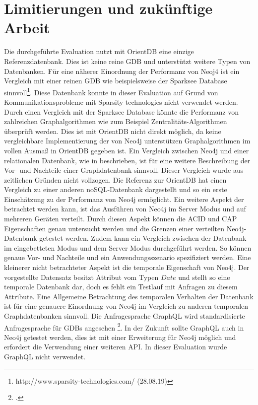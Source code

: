 \section{Limitierungen und zukünftige Arbeit}
Die durchgeführte Evaluation nutzt mit OrientDB  eine einzige Referenzdatenbank. Dies ist keine reine GDB und unterstützt weitere Typen von Datenbanken. Für eine näherer Einordnung der Performanz von Neoj4 ist ein Vergleich mit einer reinen GDB wie beispielsweise der Sparksee Database sinnvoll\footnote{http://www.sparsity-technologies.com/ (28.08.19)}. Diese Datenbank konnte in dieser Evaluation auf Grund von Kommunikationsprobleme mit Sparsity technologies nicht verwendet werden. Durch einen Vergleich mit der Sparksee Database könnte die Performanz von zahlreichen Graphalgorithmen   wie zum Beispiel Zentralitäts-Algorithmen überprüft werden. Dies ist mit OrientDB nicht direkt möglich, da keine vergleichbare Implementierung der von Neo4j unterstützen Graphalgorithmen im vollen Ausmaß in OrientDB gegeben ist. \newline 
Ein Vergleich zwischen Neo4j und einer relationalen Datenbank, wie in \parencite{vicknair2010comparison} beschrieben, ist für eine weitere Beschreibung der Vor- und Nachteile einer Graphdatenbank sinnvoll. Dieser Vergleich wurde aus zeitlichen Gründen nicht vollzogen. Die Referenz zur OrientDB hat einen Vergleich zu einer anderen noSQL-Datenbank dargestellt und so ein erste Einschätzung zu der Performanz von Neo4j ermöglicht. \newline
Ein weitere Aspekt der betrachtet werden kann, ist das Ausführen von Neo4j im Server Modus und auf mehreren Geräten verteilt. Durch diesen Aspekt können die ACID und CAP Eigenschaften genau untersucht werden und die Grenzen einer verteilten Neo4j-Datenbank getestet werden. Zudem kann ein Vergleich zwischen der Datenbank im eingebetteten Modus und dem Server Modus durchgeführt werden. So können genaue Vor- und Nachteile und ein Anwendungsszenario spezifiziert werden. \newline
Eine kleinerer nicht betrachteter Aspekt ist die temporale Eigenschaft von Neo4j. Der vorgestellte Datensatz besitzt Attribut vom Typen $Date$ und stellt so eine temporale Datenbank dar, doch es fehlt ein Testlauf mit Anfragen zu diesem Attribute. Eine Allgemeine Betrachtung des temporalen Verhalten der Datenbank ist für eine genauere Einordnung von Neo4j im Vergleich zu anderen temporalen Graphdatenbanken sinnvoll.   \newline
Die Anfragesprache GraphQL wird standardisierte Anfragesprache für GDBs angesehen \footcite{https://www.gqlstandards.org/}. In der Zukunft sollte GraphQL auch in Neo4j getestet werden, dies ist mit einer Erweiterung für Neo4j möglich und erfordert die Verwendung einer weiteren API. In dieser Evaluation wurde GraphQL nicht verwendet. 
